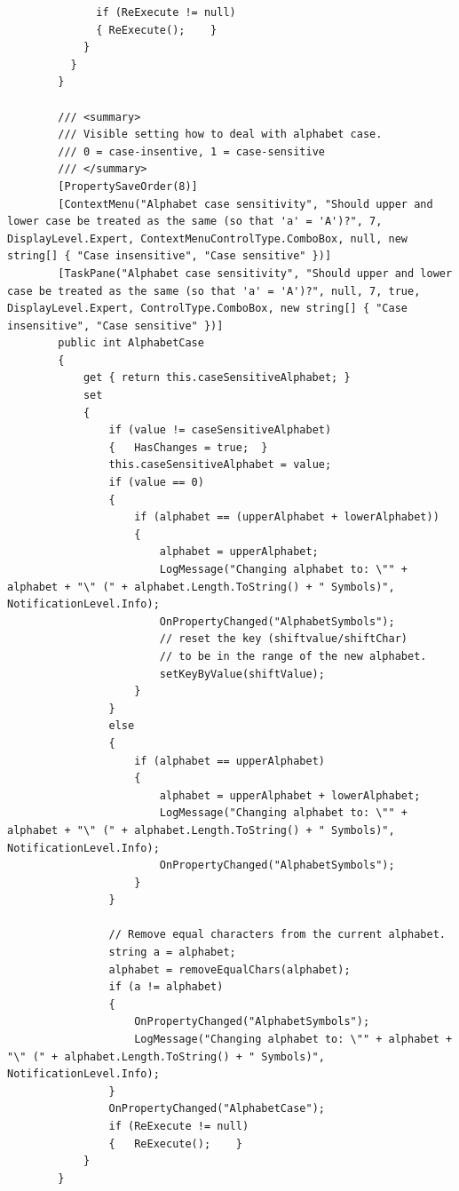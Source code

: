\begin{lstlisting}
              if (ReExecute != null)
              {	ReExecute();	}
            }
          }
        }

        /// <summary>
        /// Visible setting how to deal with alphabet case.
        /// 0 = case-insentive, 1 = case-sensitive
        /// </summary>
        [PropertySaveOrder(8)]
        [ContextMenu("Alphabet case sensitivity", "Should upper and lower case be treated as the same (so that 'a' = 'A')?", 7, DisplayLevel.Expert, ContextMenuControlType.ComboBox, null, new string[] { "Case insensitive", "Case sensitive" })]
        [TaskPane("Alphabet case sensitivity", "Should upper and lower case be treated as the same (so that 'a' = 'A')?", null, 7, true, DisplayLevel.Expert, ControlType.ComboBox, new string[] { "Case insensitive", "Case sensitive" })]
        public int AlphabetCase
        {
            get { return this.caseSensitiveAlphabet; }
            set
            {
                if (value != caseSensitiveAlphabet)
                {	HasChanges = true;	}
                this.caseSensitiveAlphabet = value;
                if (value == 0)
                {
                    if (alphabet == (upperAlphabet + lowerAlphabet))
                    {
                        alphabet = upperAlphabet;
                        LogMessage("Changing alphabet to: \"" + alphabet + "\" (" + alphabet.Length.ToString() + " Symbols)", NotificationLevel.Info);
                        OnPropertyChanged("AlphabetSymbols");
                        // reset the key (shiftvalue/shiftChar)
                        // to be in the range of the new alphabet.
                        setKeyByValue(shiftValue);
                    }
                }
                else
                {
                    if (alphabet == upperAlphabet)
                    {
                        alphabet = upperAlphabet + lowerAlphabet;
                        LogMessage("Changing alphabet to: \"" + alphabet + "\" (" + alphabet.Length.ToString() + " Symbols)", NotificationLevel.Info);
                        OnPropertyChanged("AlphabetSymbols");
                    }
                }

                // Remove equal characters from the current alphabet.
                string a = alphabet;
                alphabet = removeEqualChars(alphabet);
                if (a != alphabet)
                {
                    OnPropertyChanged("AlphabetSymbols");
                    LogMessage("Changing alphabet to: \"" + alphabet + "\" (" + alphabet.Length.ToString() + " Symbols)", NotificationLevel.Info);
                }
                OnPropertyChanged("AlphabetCase");
                if (ReExecute != null)
                {	ReExecute();	}
            }
        }


\end{lstlisting}
